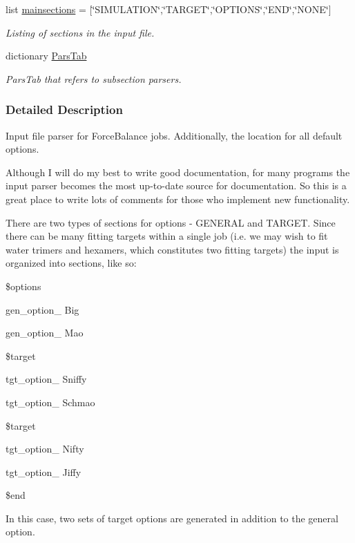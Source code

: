 \begin{DoxyCompactItemize}
list \hyperlink{namespaceforcebalance_1_1parser_a682a3870774181592a7a4784ab108ae6}{mainsections} = \mbox{[}\char`\"{}S\-I\-M\-U\-L\-A\-T\-I\-O\-N\char`\"{},\char`\"{}T\-A\-R\-G\-E\-T\char`\"{},\char`\"{}O\-P\-T\-I\-O\-N\-S\char`\"{},\char`\"{}E\-N\-D\char`\"{},\char`\"{}N\-O\-N\-E\char`\"{}\mbox{]}
\begin{DoxyCompactList}\small\item\em Listing of sections in the input file. \end{DoxyCompactList}\item 
dictionary \hyperlink{namespaceforcebalance_1_1parser_a492c80e361e80dc74aebc13e7a072dfb}{Pars\-Tab}
\begin{DoxyCompactList}\small\item\em Pars\-Tab that refers to subsection parsers. \end{DoxyCompactList}\end{DoxyCompactItemize}


\subsubsection{Detailed Description}
Input file parser for Force\-Balance jobs. Additionally, the location for all default options.

Although I will do my best to write good documentation, for many programs the input parser becomes the most up-\/to-\/date source for documentation. So this is a great place to write lots of comments for those who implement new functionality.

There are two types of sections for options -\/ G\-E\-N\-E\-R\-A\-L and T\-A\-R\-G\-E\-T. Since there can be many fitting targets within a single job (i.\-e. we may wish to fit water trimers and hexamers, which constitutes two fitting targets) the input is organized into sections, like so\-:

\$options\par
 gen\-\_\-option\-\_ Big\par
 gen\-\_\-option\-\_ Mao\par
 \$target\par
 tgt\-\_\-option\-\_ Sniffy\par
 tgt\-\_\-option\-\_ Schmao\par
 \$target\par
 tgt\-\_\-option\-\_ Nifty\par
 tgt\-\_\-option\-\_ Jiffy\par
 \$end

In this case, two sets of target options are generated in addition to the general option.

